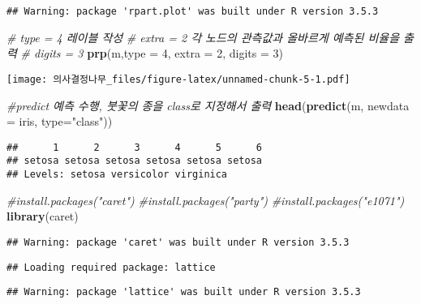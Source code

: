 \documentclass[]{article}
\newenvironment{Shaded}{\begin{snugshade}}{\end{snugshade}}
\newcommand{\KeywordTok}[1]{\textcolor[rgb]{0.13,0.29,0.53}{\textbf{#1}}}
\newcommand{\DataTypeTok}[1]{\textcolor[rgb]{0.13,0.29,0.53}{#1}}
\newcommand{\DecValTok}[1]{\textcolor[rgb]{0.00,0.00,0.81}{#1}}
\newcommand{\StringTok}[1]{\textcolor[rgb]{0.31,0.60,0.02}{#1}}
\newcommand{\CommentTok}[1]{\textcolor[rgb]{0.56,0.35,0.01}{\textit{#1}}}
\newcommand{\NormalTok}[1]{#1}
\begin{document}
\begin{verbatim}
## Warning: package 'rpart.plot' was built under R version 3.5.3
\end{verbatim}

\begin{Shaded}
\begin{Highlighting}[]
\CommentTok{# type = 4 레이블 작성}
\CommentTok{# extra = 2 각 노드의 관측값과 올바르게 예측된 비율을 출력}
\CommentTok{# digits = 3}
\KeywordTok{prp}\NormalTok{(m,}\DataTypeTok{type =} \DecValTok{4}\NormalTok{, }\DataTypeTok{extra =} \DecValTok{2}\NormalTok{, }\DataTypeTok{digits =} \DecValTok{3}\NormalTok{)}
\end{Highlighting}
\end{Shaded}

\texttt{[image: 의사결정나무\_files/figure-latex/unnamed-chunk-5-1.pdf]}

\begin{Shaded}
\begin{Highlighting}[]
\CommentTok{#predict 예측 수행, 붓꽃의 종을 class로 지정해서 출력}
\KeywordTok{head}\NormalTok{(}\KeywordTok{predict}\NormalTok{(m, }\DataTypeTok{newdata =}\NormalTok{ iris, }\DataTypeTok{type=}\StringTok{"class"}\NormalTok{))}
\end{Highlighting}
\end{Shaded}

\begin{verbatim}
##      1      2      3      4      5      6 
## setosa setosa setosa setosa setosa setosa 
## Levels: setosa versicolor virginica
\end{verbatim}

\begin{Shaded}
\begin{Highlighting}[]
\CommentTok{#install.packages("caret")}
\CommentTok{#install.packages("party")}
\CommentTok{#install.packages("e1071")}
\KeywordTok{library}\NormalTok{(caret)}
\end{Highlighting}
\end{Shaded}

\begin{verbatim}
## Warning: package 'caret' was built under R version 3.5.3
\end{verbatim}

\begin{verbatim}
## Loading required package: lattice
\end{verbatim}

\begin{verbatim}
## Warning: package 'lattice' was built under R version 3.5.3
\end{verbatim}
\end{document}
